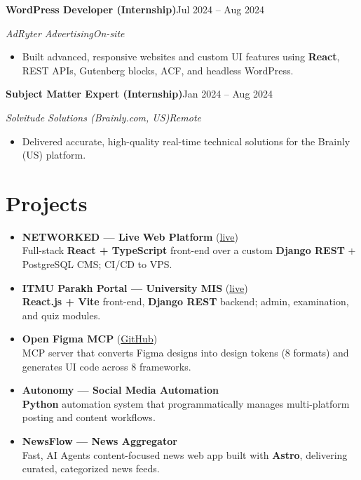 \documentclass[a4paper,10pt]{article}
\newcommand{\entry}[4]{%
  \vspace{3pt}%
  \textbf{#1}\hfill #2\par
  \vspace{1pt}%
  \textit{#3}\hfill \textit{#4}\par
  \vspace{2pt}%
}
\begin{document}
\entry{WordPress Developer (Internship)}{Jul 2024 -- Aug 2024}{AdRyter Advertising}{On-site}
\begin{itemize}
  \item Built advanced, responsive websites and custom UI features using \textbf{React}, REST APIs,
        Gutenberg blocks, ACF, and headless WordPress.
\end{itemize}

\entry{Subject Matter Expert (Internship)}{Jan 2024 -- Aug 2024}{Solvitude Solutions (Brainly.com, US)}{Remote}
\begin{itemize}
  \item Delivered accurate, high-quality real-time technical solutions for the Brainly (US) platform.
\end{itemize}

\section{Projects}
\begin{itemize}
  \item \textbf{NETWORKED --- Live Web Platform} (\href{https://networkedconsultancy.com}{live})\\
        Full-stack \textbf{React + TypeScript} front-end over a custom \textbf{Django REST} + PostgreSQL CMS; CI/CD to VPS.
  \item \textbf{ITMU Parakh Portal --- University MIS} (\href{https://parakh.itmuniversity.ac.in}{live})\\
        \textbf{React.js + Vite} front-end, \textbf{Django REST} backend; admin, examination, and quiz modules.
  \item \textbf{Open Figma MCP} (\href{https://github.com/Shivam990q/open-figma-mcp}{GitHub})\\
        MCP server that converts Figma designs into design tokens (8 formats) and generates UI code across 8 frameworks.
  \item \textbf{Autonomy --- Social Media Automation}\\
        \textbf{Python} automation system that programmatically manages multi-platform posting and content workflows.
  \item \textbf{NewsFlow --- News Aggregator}\\
        Fast, AI Agents content-focused news web app built with \textbf{Astro}, delivering curated, categorized news feeds.
\end{itemize}
\end{document}
